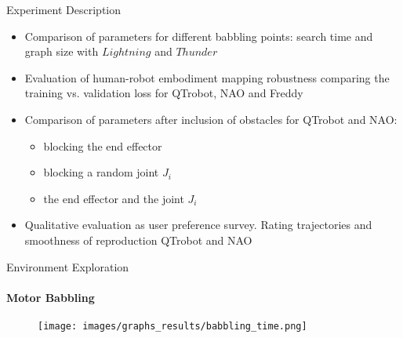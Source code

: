\documentclass[aspectratio=169]{beamer}
\newcommand\blfootnote[1]{%
	\begingroup
	\renewcommand\thefootnote{}\footnote{#1}%
	\addtocounter{footnote}{-1}%
	\endgroup
}
\begin{document}

\begin{frame}{Experiment Description}
	\begin{itemize}
		\item Comparison of parameters for different babbling points: search time and graph size with $Lightning$ and $Thunder$
		\newline
		\item Evaluation of human-robot embodiment mapping robustness comparing the training vs. validation loss for QTrobot, NAO and Freddy
		\newline
		\item Comparison of parameters after inclusion of obstacles for QTrobot and NAO:
		\begin{itemize}
			 \item blocking the end effector
			 \item blocking a random joint $J_{i}$ 
			 \item the end effector and the joint $J_i$
		 \end{itemize}\hfill
		\item Qualitative evaluation as user preference survey. Rating trajectories and
		smoothness of reproduction QTrobot and NAO
	\end{itemize}
\end{frame}

\begin{frame}{Environment Exploration} 
	\framesubtitle{Motor Babbling}
	\begin{minipage}{\linewidth}	
		\begin{figure}[h!]
			\texttt{[image: images/graphs\_results/babbling\_time.png]}
			\label{fig:object_representation}
		\end{figure}
	\end{minipage}
\end{frame}
\end{document}
